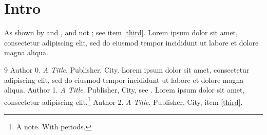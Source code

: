 \documentclass{article}
\begin{document}
\section{Intro}
As shown by \cite{knuth} and \cite{lamport,knuth}, and not \cite{nobody}; see item \ref{third}. Lorem ipsum dolor sit amet, consectetur adipiscing elit, sed do eiusmod tempor incididunt ut labore et dolore magna aliqua.

\begin{thebibliography}{9}
 Author 0. \emph{A Title}. Publisher, City. Lorem ipsum dolor sit amet, consectetur adipiscing elit, sed do eiusmod tempor incididunt ut labore et dolore magna aliqua.
 Author 1. \emph{A Title}. Publisher, City, see \cite{knuth}. Lorem ipsum dolor sit amet, consectetur adipiscing elit.\footnote{A note. With periods.}
 Author 2.\label{third} \emph{A Title}. Publisher, City, item \ref{third}.
\end{thebibliography}
\end{document}
